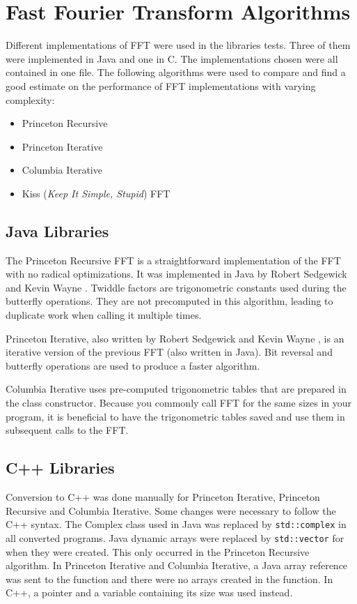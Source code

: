 \section{Fast Fourier Transform Algorithms}

Different implementations of FFT were used in the libraries tests. Three of them were implemented in Java and one in C. The implementations chosen were all contained in one file. The following algorithms were used to compare and find a good estimate on the performance of FFT implementations with varying complexity:

\begin{itemize}
    \item Princeton Recursive \cite{princeton:recursive}
    \item Princeton Iterative \cite{princeton:iterative}
    \item Columbia Iterative \cite{columbia:iterative}
    \item Kiss (\emph{Keep It Simple, Stupid}) FFT \cite{kiss:fft}
\end{itemize}

\subsection{Java Libraries}

The Princeton Recursive FFT is a straightforward implementation of the FFT with no radical optimizations. It was implemented in Java by Robert Sedgewick and Kevin Wayne \cite{princeton:recursive}. Twiddle factors are trigonometric constants used during the butterfly operations. They are not precomputed in this algorithm, leading to duplicate work when calling it multiple times.

Princeton Iterative, also written by Robert Sedgewick and Kevin Wayne \cite{princeton:iterative}, is an iterative version of the previous FFT (also written in Java). Bit reversal and butterfly operations are used to produce a faster algorithm.

Columbia Iterative \cite{columbia:iterative} uses pre-computed trigonometric tables that are prepared in the class constructor. Because you commonly call FFT for the same sizes in your program, it is beneficial to have the trigonometric tables saved and use them in subsequent calls to the FFT.

\subsection{C++ Libraries}
Conversion to C++ was done manually for Princeton Iterative, Princeton Recursive and Columbia Iterative. Some changes were necessary to follow the C++ syntax. The Complex class used in Java was replaced by \texttt{std::complex} in all converted programs. Java dynamic arrays were replaced by \texttt{std::vector} for when they were created. This only occurred in the Princeton Recursive algorithm. In Princeton Iterative and Columbia Iterative, a Java array reference was sent to the function and there were no arrays created in the function. In C++, a pointer and a variable containing its size was used instead.

